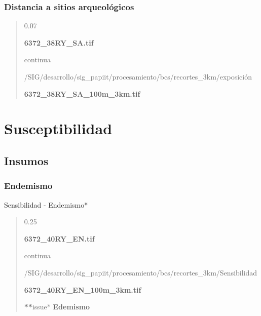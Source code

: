 \documentclass[letterpaper,10pt,spanish]{sphinxmanual}
\begin{document}
\subsection{Distancia a sitios arqueológicos}
\label{\detokenize{exposicion_bcs:distancia-a-sitios-arqueologicos}}
\begin{quote}

 0.07

 {\color{red}\bfseries{}\textbar{}6372\_38RY\_SA.tif\textbar{}}


 continua


 /SIG/desarrollo/sig\_papiit/procesamiento/bcs/recortes\_3km/exposición

  {\color{red}\bfseries{}\textbar{}6372\_38RY\_SA\_100m\_3km.tif\textbar{}}
\begin{quote}

   \textbar{}\textbar{}
\end{quote}
\end{quote}


\chapter{Susceptibilidad}
\label{\detokenize{sensibilidad_bcs:susceptibilidad}}\label{\detokenize{sensibilidad_bcs::doc}}

\section{Insumos}
\label{\detokenize{sensibilidad_bcs:insumos}}

\subsection{Endemismo}
\label{\detokenize{sensibilidad_bcs:endemismo}}
Sensibilidad - Endemismo*
\begin{quote}

 0.25

 {\color{red}\bfseries{}\textbar{}6372\_40RY\_EN.tif\textbar{}}


 continua


 /SIG/desarrollo/sig\_papiit/procesamiento/bcs/recortes\_3km/Sensibilidad

  {\color{red}\bfseries{}\textbar{}6372\_40RY\_EN\_100m\_3km.tif\textbar{}}

{\color{red}\bfseries{}**}issue* {\color{red}\bfseries{}\textbar{}Edemismo\textbar{}}
\end{quote}
\end{document}
